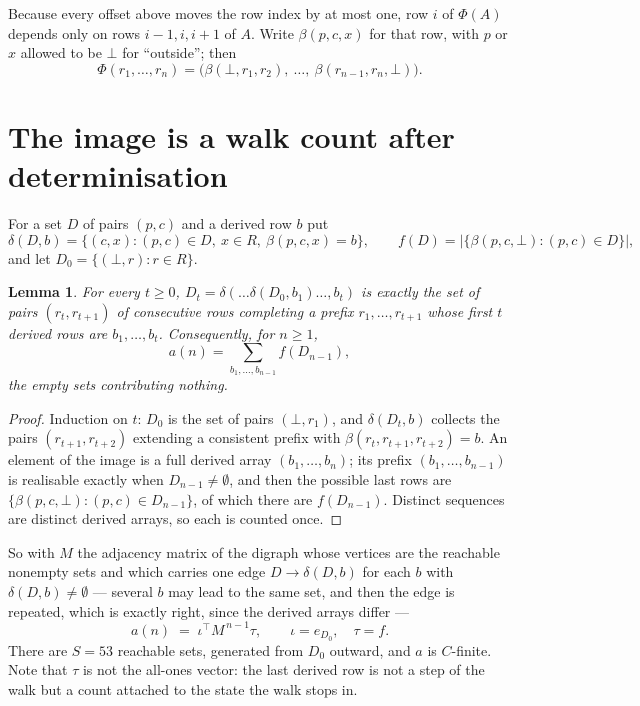 \documentclass[11pt,a4paper]{article}
\theoremstyle{plain}
\newtheorem{lemma}[theorem]{Lemma}
\theoremstyle{definition}
\begin{document}
Because every offset above moves the row index by at most one, row $i$ of
$\Phi(A)$ depends only on rows $i-1,i,i+1$ of $A$. Write $\beta(p,c,x)$ for that row, with $p$
or $x$ allowed to be $\bot$ for ``outside''; then
\[
\Phi(r_1,\dots,r_n)=\bigl(\beta(\bot,r_1,r_2),\ \dots,\ \beta(r_{n-1},r_n,\bot)\bigr).
\]

\section{The image is a walk count after determinisation}

For a set $D$ of pairs $(p,c)$ and a derived row $b$ put
\[
\delta(D,b)=\{(c,x):(p,c)\in D,\ x\in R,\ \beta(p,c,x)=b\},\qquad
f(D)=\bigl|\{\beta(p,c,\bot):(p,c)\in D\}\bigr| ,
\]
and let $D_0=\{(\bot,r):r\in R\}$.

\begin{lemma}\label{lem:det}
For every $t\ge0$, $D_t=\delta(\dots\delta(D_0,b_1)\dots,b_t)$ is exactly the set of pairs
$(r_t,r_{t+1})$ of consecutive rows completing a prefix $r_1,\dots,r_{t+1}$ whose first $t$
derived rows are $b_1,\dots,b_t$. Consequently, for $n\ge1$,
\[
a(n)=\sum_{b_1,\dots,b_{n-1}}f(D_{n-1}),
\]
the empty sets contributing nothing.
\end{lemma}

\begin{proof}
Induction on $t$: $D_0$ is the set of pairs $(\bot,r_1)$, and $\delta(D_t,b)$ collects the
pairs $(r_{t+1},r_{t+2})$ extending a consistent prefix with
$\beta(r_t,r_{t+1},r_{t+2})=b$. An element of the image is a full derived array
$(b_1,\dots,b_n)$; its prefix $(b_1,\dots,b_{n-1})$ is realisable exactly when
$D_{n-1}\neq\emptyset$, and then the possible last rows are
$\{\beta(p,c,\bot):(p,c)\in D_{n-1}\}$, of which there are $f(D_{n-1})$. Distinct sequences
are distinct derived arrays, so each is counted once.
\end{proof}

So with $M$ the adjacency matrix of the digraph whose vertices are the reachable nonempty sets
and which carries one edge $D\to\delta(D,b)$ for each $b$ with $\delta(D,b)\neq\emptyset$ ---
several $b$ may lead to the same set, and then the edge is repeated, which is exactly right,
since the derived arrays differ ---
\[
a(n)\;=\;\iota^{\!\top}M^{\,n-1}\tau,\qquad \iota=e_{D_0},\quad \tau=f .
\]
There are $S=53$ reachable sets, generated from $D_0$ outward, and $a$ is $C$-finite.
Note that $\tau$ is not the all-ones vector: the last derived row is not a
step of the walk but a count attached to the state the walk stops in.
\end{document}
